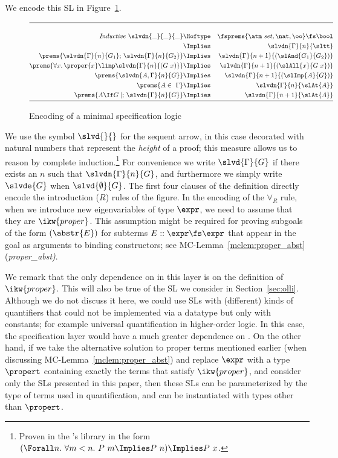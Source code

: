 \documentclass[final]{svjour3}
\begin{document}
We encode this SL in Figure~\ref{fig:nseq}.
\begin{figure}\begin{eqnarray*}
\hline\\
  \mathit{Inductive} \  \slvdn{ \_}{ \_ }{ \_}& \Hoftype&
  \fsprems{\atm\ \mathit{set} ,\nat, \oo}\fs\bool \\ 
  &\Implies &\slvdn{\Gamma}{n}{\sltt}\\
  \prems{\slvdn{\Gamma}{n}{G_1}; \,\slvdn{\Gamma}{n}{G_2}  } & \Implies &
  \slvdn{\Gamma}{n+1}{(\slAnd{G_1}{G_2})}\\ 
  \prems{\forall x.\,\proper{x}\limp \slvdn{\Gamma}{n}{(G\ x)}  } & \Implies &
  \slvdn{\Gamma}{n+1}{(\slAll{x}{G\ x})}\\ 
  \prems{ \slvdn{A,\Gamma}{n}{G}  } & \Implies &
  \slvdn{\Gamma}{n+1}{(\slImp{A}{G})}\\ 
  \prems{A\in \ \Gamma  } & \Implies & \slvdn{\Gamma}{n}{\slAt{A}}\\  
  \prems{\sbc{A}{G};\, \slvdn{\Gamma}{n}{G}} & \Implies &
  \slvdn{\Gamma}{n+1}{\slAt{A}}
 \\[.5ex]\hline
\end{eqnarray*}
\caption{Encoding of a minimal specification logic}
\label{fig:nseq}
\end{figure}
We use the symbol $\slvd{}{}$ for the sequent arrow, 
in this case decorated with natural numbers that represent the
\emph{height} of a proof; this measure allows us to reason by complete
induction.\footnote{Proven in the \HOL's library in the form $(\Forall
  n.\ \forall m<n.\ P~m\Implies P~n) \Implies P~x$.}  For convenience
we write $\slvd{\Gamma}{G}$ if there exists an $n$ such that
$\slvdn{\Gamma}{n}{G}$, and furthermore we simply write $\slvde{G}$
when $\slvd{\emptyset}{G}$.  The first four clauses of the definition
directly encode the introduction ($R$) rules of the figure.
In the encoding of the $\forall_R$ rule, when we introduce new
eigenvariables of type $\expr$, we need to assume that they are
$\ikw{proper}$.  This assumption might be required for proving
subgoals of the form $(\abstr{E})$ for subterms $E ::\expr\fs\expr$
that appear in the goal as arguments to binding constructors; see
MC-Lemma~\ref{mclem:proper_abst} (\textit{proper\_abst)}.

We remark that  the only dependence on \hybrid in this layer 
is on the definition of $\ikw{proper}$.  This will also be true of the
SL we consider in Section~\ref{sec:olli}.  Although we do not discuss
it here, we could use SLs with (different) kinds of quantifiers that
could not be implemented via a datatype but only with \hybrid
constants; for example universal quantification in higher-order logic.
In this case, the specification layer would have a much greater
dependence on \hybrid.  On the other hand, if we take the alternative
solution to proper terms mentioned earlier
(when discussing MC-Lemma~\ref{mclem:proper_abst}) and replace $\expr$
with a type $\propert$ containing exactly the terms that satisfy
$\ikw{proper}$, and consider only the SLs presented in this paper,
then these SLs can be parameterized by the type of terms used in
quantification, and can be instantiated with types other than
$\propert$.
\end{document}
